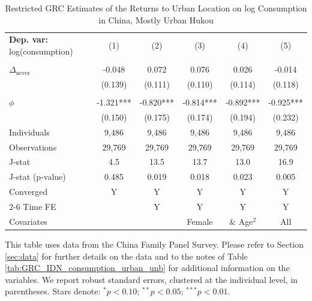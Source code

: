 \begin{table}[htbp] \centering \begin{threeparttable}
 \caption{Restricted GRC Estimates of the Returns to Urban Location on log Consumption in China, Mostly Urban Hukou} 
 \label{tab:GRC_CHN_most_urban_consumption_urban_unb} 
\begin{tabular}{l ccccc} \toprule  \textbf{Dep. var:}  log(consumption) 
                    &\multicolumn{1}{c}{(1)}   &\multicolumn{1}{c}{(2)}   &\multicolumn{1}{c}{(3)}   &\multicolumn{1}{c}{(4)}   &\multicolumn{1}{c}{(5)}   \\
                    &               &               &               &               &               \\
\addlinespace
$\Delta_{\text{never}}$&      -0.048   &       0.072   &       0.076   &       0.026   &      -0.014   \\
                    &     (0.139)   &     (0.111)   &     (0.110)   &     (0.114)   &     (0.118)   \\
                    &               &               &               &               &               \\
\addlinespace
$\phi$              &      -1.321***&      -0.820***&      -0.814***&      -0.892***&      -0.925***\\
                    &     (0.150)   &     (0.175)   &     (0.174)   &     (0.194)   &     (0.232)   \\
\addlinespace
Individuals         &       9,486   &       9,486   &       9,486   &       9,486   &       9,486   \\
Observations        &      29,769   &      29,769   &      29,769   &      29,769   &      29,769   \\
J-stat              &         4.5   &        13.5   &        13.7   &        13.0   &        16.9   \\
J-stat (p-value)    &       0.485   &       0.019   &       0.018   &       0.023   &       0.005   \\
Converged           &           Y   &           Y   &           Y   &           Y   &           Y   \\
\cmidrule{2-6} Time FE & & Y & Y & Y & Y \\ Covariates & & & Female & \& Age$^2$ & All \\ \bottomrule \end{tabular} \begin{tablenotes}[flushleft] \footnotesize \item{This table uses data from the China Family Panel Survey. Please refer to Section \ref{sec:data} for further details on the data and to the notes of Table \ref{tab:GRC_IDN_consumption_urban_unb} for additional information on the variables. We report robust standard errors, clustered at the individual level, in parentheses. Stars denote: $^{*} p<0.10$; $^{**} p<0.05$; $^{***} p<0.01$.} \end{tablenotes} \end{threeparttable} \end{table}

